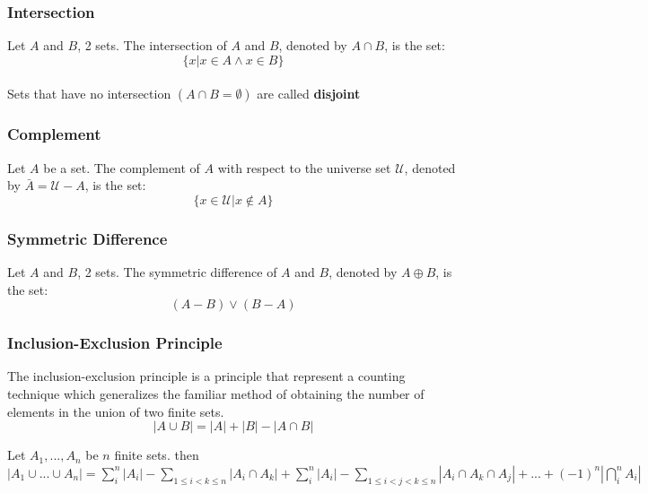 \documentclass{article}
\begin{document}
\subsubsection{Intersection} Let $ A $ and $ B $, 2 sets. The intersection of $ A $ and $ B $, denoted by $ A \cap B $, is the set:
\begin{equation}
\{x | x \in A \wedge x \in B\}
\end{equation}
\\
Sets that have no intersection $ (A \cap B = \emptyset) $ are called \textbf{disjoint}

\subsubsection{Complement} Let $ A $ be a set. The complement of $ A $ with respect to the universe set $ \mathcal{U} $, denoted by $ \bar{A} = \mathcal{U} - A $, is the set:
\begin{equation}
\{x \in \mathcal{U} | x \notin A\}
\end{equation}

\subsubsection{Symmetric Difference} Let $ A $ and $ B $, 2 sets. The symmetric difference of $ A $ and $ B $, denoted by $ A \oplus B $, is the set:
\begin{equation}
(A - B) \vee (B - A)
\end{equation}

\subsubsection{Inclusion-Exclusion Principle} The inclusion-exclusion principle is a principle that represent a counting technique which generalizes the familiar method of obtaining the number of elements in the union of two finite sets. 
\begin{equation}
|A \cup B| = |A| + |B| - |A \cap B|
\end{equation}
\begin{tcolorbox}[sharp corners, colback=green!30, colframe=green!80!blue, title=Cardinality of Sets Union]
Let $ A_1,...,A_n $ be $ n $ finite sets. then $ |A_1 \cup ... \cup A_n| = \sum_{i}^{n}|A_i| - \sum_{1 \leq i < k \leq n}|A_i \cap A_k| + \sum_{i}^{n}|A_i| - \sum_{1 \leq i < j < k \leq n}|A_i \cap A_k \cap A_j| + ... + (-1)^n |\bigcap\limits_{i}^{n}A_i| $ 
\end{tcolorbox}
\end{document}
